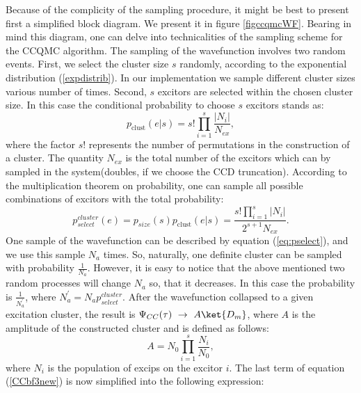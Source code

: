 \documentclass[twoside,english]{uiofysmaster}
\begin{document}
Because of the complicity of the sampling procedure, it might be best
to present first a simplified block diagram. We present it in figure
\ref{figccqmcWF}. Bearing in mind this diagram, one can delve into
technicalities of the sampling scheme for the CCQMC algorithm.  The
sampling of the wavefunction involves two random events.  First, we
select the cluster size $s$ randomly, according to the exponential
distribution (\ref{expdistrib}). In our implementation we sample
different cluster sizes various number of times.  Second, $s$ excitors
are selected within the chosen cluster size. In this case the
conditional probability to choose $s$ excitors stands as:
\begin{equation}\label{condprob}
p_{\text{clust}} (e|s)= s! \prod_{i=1}^s \frac{|N_i|}{N_{ex}},
\end{equation}
where the factor $s!$ represents the number of permutations in the construction of a cluster.
The quantity $N_{ex}$ is the total number of the excitors which can by sampled in the system(doubles, if we choose the CCD truncation). According to the multiplication theorem on probability, one can sample all possible combinations of excitors with the total probability:
\begin{equation}\label{eq:pselect}
p_{select}^{cluster}(e)= p_{size}(s) p_{\text{clust}} (e|s) =  \frac{s!\prod_{i=1}^{s} |N_i|}{2^{s+1}N_{ex}}.
\end{equation}
One sample of the wavefunction can be described by equation (\ref{eq:pselect}), and we use this sample $N_a$ times. So, naturally, one definite cluster can be sampled with probability $\frac{1}{N_a}$. %
However, it is easy to notice that the above mentioned two random processes will change $N_a$ so, that it decreases. In this case the probability is $\frac{1}{N_a^\prime}$, where $N_a^\prime = N_a p_{select}^{cluster}$.
After the wavefunction collapsed to a given excitation cluster, the result is $\Psi_{CC}(\tau)\ \rightarrow\ A\ket{D_m}$,
where $A$ is the amplitude of the constructed cluster and is defined as follows:
\begin{equation}
A = N_0  \prod_{i=1}^s \frac{N_i}{N_0},
\end{equation}
where $N_i$ is the population of excips on the excitor $i$. 
The last term of equation (\ref{CCbf3new}) is now simplified into the following expression:
\end{document}
